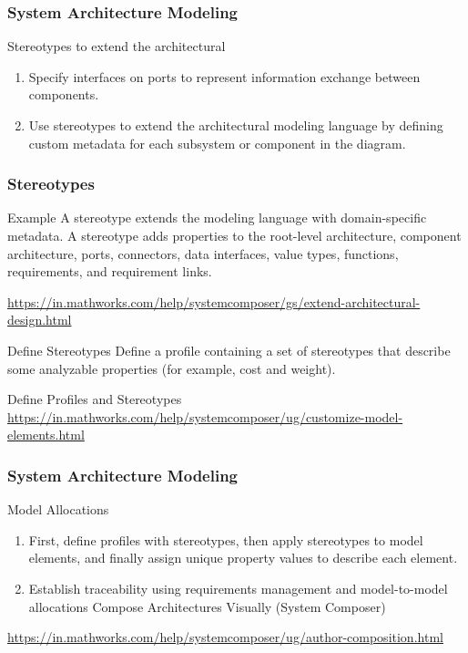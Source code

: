 \begin{frame}
\frametitle{System Architecture Modeling }
\begin{block}{Stereotypes to extend the architectural}
\begin{enumerate}
 \setlength{\itemsep}{0pt}
    \item  Specify interfaces on ports to represent information exchange between components.
    \item    Use stereotypes to extend the architectural modeling language by defining custom metadata for each subsystem or component in the diagram.
\end{enumerate}
\end{block}
\end{frame}





\begin{frame}
\frametitle{Stereotypes  }
\begin{block}{Example}
 A stereotype extends the modeling language with domain-specific metadata. A stereotype adds properties to the root-level architecture, component architecture, ports, connectors, data interfaces, value types, functions, requirements, and requirement links. 

 \url{https://in.mathworks.com/help/systemcomposer/gs/extend-architectural-design.html}
 
\end{block}
\end{frame}

\begin{frame}
\begin{block}{Define Stereotypes }
Define a profile containing a set of stereotypes that describe some analyzable properties (for example, cost and weight).

Define Profiles and Stereotypes 
\url{https://in.mathworks.com/help/systemcomposer/ug/customize-model-elements.html}


\end{block}
\end{frame}



\begin{frame}
\frametitle{System Architecture Modeling }
\begin{block}{ Model Allocations}
\begin{enumerate}
 \setlength{\itemsep}{0pt}
      \item   First, define profiles with stereotypes, then apply stereotypes to model elements, and finally assign unique property values to describe each element. 
    \item  Establish traceability using requirements management and model-to-model allocations Compose Architectures Visually (System Composer)  
\end{enumerate}

\url{https://in.mathworks.com/help/systemcomposer/ug/author-composition.html}

\end{block}
\end{frame}



